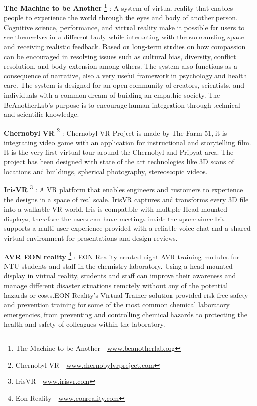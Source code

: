 \textbf{The Machine to be Another} \footnote{The Machine to be Another - \url{www.beanotherlab.org}} : A system of virtual reality that enables people to experience the world through the eyes and body of another person. Cognitive science, performance, and virtual reality make it possible for users to see themselves in a different body while interacting with the surrounding space and receiving realistic feedback. Based on long-term studies on how compassion can be encouraged in resolving issues such as cultural bias, diversity, conflict resolution, and body extension among others. The system also functions as a consequence of narrative, also a very useful framework in psychology and health care.
The system is designed for an open community of creators, scientists, and individuals with a common dream of building an empathic society. The BeAnotherLab's purpose is to encourage human integration through technical and scientific knowledge.

\textbf{Chernobyl VR} \footnote{Chernobyl VR - \url{www.chernobylvrproject.com}} : Chernobyl VR Project is made by The Farm 51,  it is integrating video game with an application for instructional and storytelling film. It is the very first virtual tour around the Chernobyl and Pripyat area. The project has been designed with state of the art technologies like 3D scans of locations and buildings, spherical photography, stereoscopic videos. 


\textbf{IrisVR} \footnote{IrisVR - \url{www.irisvr.com}} : A VR platform that enables engineers and customers to experience the designs in a space of real scale. IrisVR captures and transforms every 3D file into a walkable VR world. Iris is compatible with multiple Head-mounted displays, therefore the users can have meetings inside the space since Iris supports a multi-user experience provided with a reliable voice chat and a shared virtual environment for presentations and design reviews.


\textbf{AVR EON reality} \footnote{Eon Reality - \url{www.eonreality.com}} : EON Reality created eight AVR training modules for NTU students and staff in the chemistry laboratory. Using a head-mounted display in virtual reality, students and staff can improve their awareness and manage different disaster situations remotely without any of the potential hazards or costs.EON Reality's Virtual Trainer solution provided risk-free safety and prevention training for some of the most common chemical laboratory emergencies, from preventing and controlling chemical hazards to protecting the health and safety of colleagues within the laboratory.




